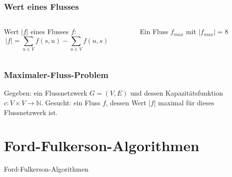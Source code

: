 \documentclass[draft]{beamer}
\newcommand{\ff}{Ford-Fulkerson}
\begin{document}
\begin{frame}
\frametitle{Wert eines Flusses}
\begin{columns}
\begin{column}{.45\textwidth}
Wert $\lvert f \rvert$ eines Flusses $f$:
\begin{equation}
\lvert f \rvert = \sum_{u\in V} f(s,u) - \sum_{u\in V} f(u,s) \nonumber
\end{equation}
\end{column}
\hfill
\pause
\begin{column}{.45\textwidth}
\begin{figure}
\begin{adjustbox}{width=\textwidth}
\end{adjustbox}
\caption{Ein Fluss $f_{max}$ mit $\lvert f_{max} \rvert = 8$}
\end{figure}
\end{column}
\end{columns}
\end{frame}

\begin{frame}
\frametitle{Maximaler-Fluss-Problem}
\begin{flushleft}
Gegeben: ein Flussnetzwerk $G = (V,E)$ und dessen Kapazitätsfunktion $c: V \times V \to \mathbb{N}$.\linebreak
Gesucht: ein Fluss $f$, dessen Wert $\lvert f \rvert$ maximal für dieses Flussnetzwerk ist.
\end{flushleft}
\end{frame}

\section{\ff -Algorithmen}
\begin{frame}[plain]
\begin{center}
\begin{LARGE}
\ff -Algorithmen
\end{LARGE}
\end{center}
\end{frame}
\end{document}
